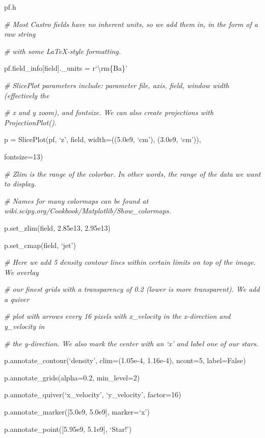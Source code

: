 pf.h

{\it\# Most Castro fields have no inherent units, so we add them in,
  in the form of a raw string} 

{\setlength{\parskip}{0pt}

{\it\# with some LaTeX-style formatting.}

pf.field\_info[field].\_units = r`\textbackslash rm\{Ba\}'
}


{\it\# SlicePlot parameters include: parameter file, axis, field, window width (effectively the}
{\setlength{\parskip}{0pt}

{\it\# x and y zoom), and fontsize. We can also create projections with ProjectionPlot().}

p = SlicePlot(pf, `z', field, width=((5.0e9, `cm'), (3.0e9, `cm')),

{\setlength{\parindent}{68pt}fontsize=13)}
}

{\it\# Zlim is the range of the colorbar. In other words, the range of the data we want to display.}
{\setlength{\parskip}{0pt}

{\it\# Names for many colormaps can be found at wiki.scipy.org/Cookbook/Matplotlib/Show\_colormaps.}

p.set\_zlim(field, 2.85e13, 2.95e13)
}

p.set\_cmap(field, `jet')

{\it\# Here we add 5 density contour lines within certain limits on top of the image. We overlay}
{\setlength{\parskip}{0pt}

{\it\# our finest grids with a transparency of 0.2 (lower is more transparent). We add a quiver}

{\it\# plot with arrows every 16 pixels with x\_velocity in the x-direction and y\_velocity in}

{\it\# the y-direction. We also mark the center with an `x' and label one of our stars.}

p.annotate\_contour(`density', clim=(1.05e-4, 1.16e-4), ncont=5, label=False)
}

p.annotate\_grids(alpha=0.2, min\_level=2)

p.annotate\_quiver(`x\_velocity', `y\_velocity', factor=16)

p.annotate\_marker([5.0e9, 5.0e9], marker=`x')

p.annotate\_point([5.95e9, 5.1e9], `Star!')

